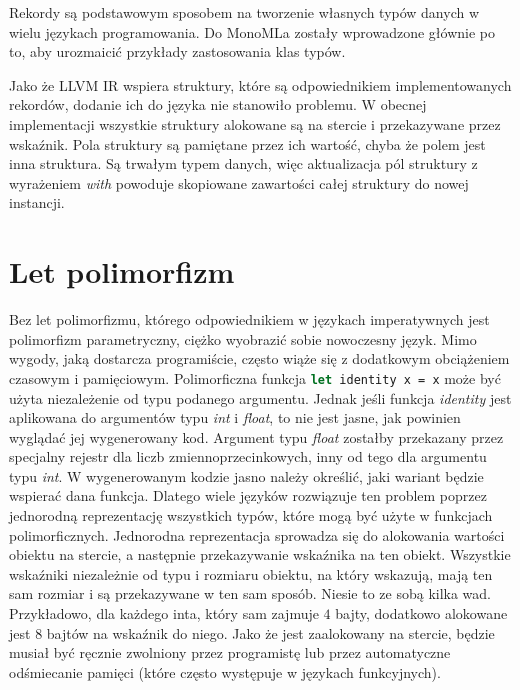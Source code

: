 \documentclass[declaration,shortabstract]{iithesis}
\begin{document}
Rekordy są podstawowym sposobem na tworzenie własnych typów danych w wielu 
językach programowania. Do MonoMLa zostały wprowadzone głównie po to, 
aby urozmaicić przykłady zastosowania klas typów. 

Jako że LLVM IR wspiera struktury, które są odpowiednikiem implementowanych 
rekordów, dodanie ich do języka nie stanowiło problemu. W obecnej 
implementacji 
wszystkie struktury alokowane są na stercie i przekazywane przez wskaźnik.
Pola struktury są pamiętane przez ich wartość, chyba że polem jest inna 
struktura. Są trwałym typem danych, więc aktualizacja pól struktury 
z wyrażeniem \textit{with} powoduje skopiowane zawartości całej struktury do 
nowej instancji.

\section{Let polimorfizm}


Bez let polimorfizmu, którego odpowiednikiem w językach imperatywnych jest 
polimorfizm parametryczny, ciężko wyobrazić sobie nowoczesny język. 
Mimo wygody, jaką dostarcza programiście, często wiąże się z dodatkowym
obciążeniem czasowym i pamięciowym. Polimorficzna funkcja 
\lstinline[language=Caml]!let identity x = x! może być użyta niezależenie
od typu podanego argumentu. Jednak jeśli funkcja \textit{identity} 
jest aplikowana do argumentów typu \textit{int} i \textit{float}, to nie jest 
jasne, jak powinien wyglądać jej wygenerowany kod. Argument typu \textit{float}
zostałby przekazany przez specjalny rejestr dla liczb zmiennoprzecinkowych, 
inny od tego dla argumentu typu \textit{int}. W wygenerowanym kodzie jasno
należy określić, jaki wariant będzie wspierać dana funkcja. Dlatego wiele 
języków rozwiązuje ten problem poprzez jednorodną reprezentację wszystkich 
typów, które mogą być użyte w funkcjach polimorficznych. Jednorodna 
reprezentacja sprowadza się do alokowania wartości obiektu na stercie, a 
następnie przekazywanie wskaźnika na ten obiekt. Wszystkie wskaźniki 
niezależnie od typu i rozmiaru obiektu, na który wskazują, mają ten sam 
rozmiar i są przekazywane w ten sam sposób. Niesie to ze sobą kilka wad.
Przykładowo, dla każdego inta, który sam zajmuje $4$ bajty,
dodatkowo alokowane jest $8$ bajtów na wskaźnik do niego. Jako że jest 
zaalokowany na stercie, będzie musiał być ręcznie zwolniony przez programistę 
lub przez automatyczne odśmiecanie pamięci (które często występuje w językach 
funkcyjnych).
\end{document}
